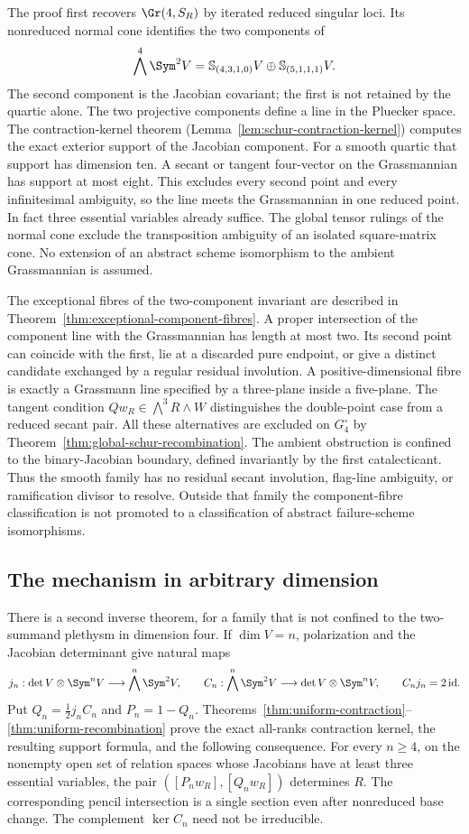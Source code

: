 The proof first recovers \(\Gr(4,S_R)\) by iterated reduced
singular loci.  Its nonreduced normal cone identifies the two
components of
\[
 \bigwedge^4\Sym^2V=
 \mathbb S_{(4,3,1,0)}V\oplus\mathbb S_{(5,1,1,1)}V.
\]
The second component is the Jacobian covariant; the first is not
retained by the quartic alone.  The two projective components define a
line in the Pluecker space.  The contraction-kernel theorem
(Lemma~\ref{lem:schur-contraction-kernel}) computes the exact exterior
support of the Jacobian component.  For a smooth quartic that support
has dimension ten.  A secant or tangent four-vector on the Grassmannian
has support at most eight.  This excludes every second point and every
infinitesimal ambiguity, so the line meets the Grassmannian in one
reduced point.  In fact three essential variables already suffice.  The global tensor rulings of the normal cone
exclude the transposition ambiguity of an isolated square-matrix
cone.  No extension of an abstract scheme isomorphism to the ambient
Grassmannian is assumed.


The exceptional fibres of the two-component invariant are described in
Theorem~\ref{thm:exceptional-component-fibres}.  A proper intersection
of the component line with the Grassmannian has length at most two.
Its second point can coincide with the first, lie at a discarded pure
endpoint, or give a distinct candidate exchanged by a regular residual
involution.  A positive-dimensional fibre is exactly a Grassmann line
specified by a three-plane inside a five-plane.  The tangent condition
\(Qw_R\in\bigwedge^3R\wedge W\) distinguishes the double-point
case from a reduced secant pair.  All these alternatives are excluded on \(G_4^\circ\) by
Theorem~\ref{thm:global-schur-recombination}.  The ambient obstruction
is confined to the binary-Jacobian boundary, defined invariantly by the
first catalecticant.  Thus the smooth family has no residual secant
involution, flag-line ambiguity, or ramification divisor to resolve.
Outside that family the component-fibre classification is not promoted
to a classification of abstract failure-scheme isomorphisms.


\subsection{The mechanism in arbitrary dimension}

There is a second inverse theorem, for a family that is not confined
to the two-summand plethysm in dimension four.  If \(\dim V=n\),
polarization and the Jacobian determinant give natural maps
\[
 j_n:\det V\otimes\Sym^nV\longrightarrow\bigwedge^n\Sym^2V,
 \qquad C_n:\bigwedge^n\Sym^2V\longrightarrow\det V\otimes\Sym^nV,
 \qquad C_nj_n=2\,\mathrm{id}.
\]
Put \(Q_n=\frac12j_nC_n\) and \(P_n=1-Q_n\).
Theorems~\ref{thm:uniform-contraction}--\ref{thm:uniform-recombination}
prove the exact all-ranks contraction kernel, the resulting support
formula, and the following consequence.  For every \(n\ge4\), on
the nonempty open set of relation spaces whose Jacobians have at
least three essential variables, the pair
\(([P_nw_R],[Q_nw_R])\) determines \(R\).  The corresponding
pencil intersection is a single section even after nonreduced base
change.  The complement \(\ker C_n\) need not be irreducible.

